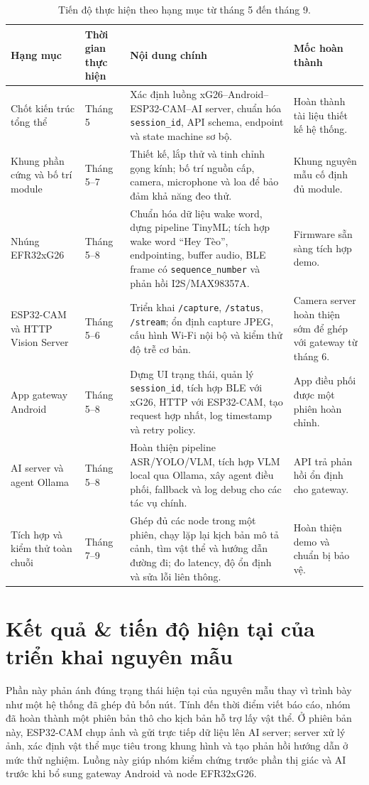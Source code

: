\documentclass[11pt,a4paper]{article}
\renewcommand{\arraystretch}{1.08}
\begin{document}
\begin{table}[H]
\centering
\caption{Tiến độ thực hiện theo hạng mục từ tháng 5 đến tháng 9.}
\small
\setlength{\tabcolsep}{4pt}
\renewcommand{\arraystretch}{1.18}
\begin{tabularx}{\textwidth}{p{3.0cm}p{2.2cm}Y p{3.0cm}}
\toprule
\textbf{Hạng mục} & \textbf{Thời gian thực hiện} & \textbf{Nội dung chính} & \textbf{Mốc hoàn thành} \\
\midrule
Chốt kiến trúc tổng thể & Tháng 5 & Xác định luồng xG26--Android--ESP32-CAM--AI server, chuẩn hóa \texttt{session\_id}, API schema, endpoint và state machine sơ bộ. & Hoàn thành tài liệu thiết kế hệ thống. \\
Khung phần cứng và bố trí module & Tháng 5--7 & Thiết kế, lắp thử và tinh chỉnh gọng kính; bố trí nguồn cấp, camera, microphone và loa để bảo đảm khả năng đeo thử. & Khung nguyên mẫu cố định đủ module. \\
Nhúng EFR32xG26 & Tháng 5--8 & Chuẩn hóa dữ liệu wake word, dựng pipeline TinyML; tích hợp wake word ``Hey Tèo'', endpointing, buffer audio, BLE frame có \texttt{sequence\_number} và phản hồi I2S/MAX98357A. & Firmware sẵn sàng tích hợp demo. \\
ESP32-CAM và HTTP Vision Server & Tháng 5--6 & Triển khai \texttt{/capture}, \texttt{/status}, \texttt{/stream}; ổn định capture JPEG, cấu hình Wi-Fi nội bộ và kiểm thử độ trễ cơ bản. & Camera server hoàn thiện sớm để ghép với gateway từ tháng 6. \\
App gateway Android & Tháng 5--8 & Dựng UI trạng thái, quản lý \texttt{session\_id}, tích hợp BLE với xG26, HTTP với ESP32-CAM, tạo request hợp nhất, log timestamp và retry policy. & App điều phối được một phiên hoàn chỉnh. \\
AI server và agent Ollama & Tháng 5--8 & Hoàn thiện pipeline ASR/YOLO/VLM, tích hợp VLM local qua Ollama, xây agent điều phối, fallback và log debug cho các tác vụ chính. & API trả phản hồi ổn định cho gateway. \\
Tích hợp và kiểm thử toàn chuỗi & Tháng 7--9 & Ghép đủ các node trong một phiên, chạy lặp lại kịch bản mô tả cảnh, tìm vật thể và hướng dẫn đường đi; đo latency, độ ổn định và sửa lỗi liên thông. & Hoàn thiện demo và chuẩn bị bảo vệ. \\
\bottomrule
\end{tabularx}
\end{table}




\section{Kết quả \& tiến độ hiện tại của triển khai nguyên mẫu}
Phần này phản ánh đúng trạng thái hiện tại của nguyên mẫu thay vì trình bày như một hệ thống đã ghép đủ bốn nút. Tính đến thời điểm viết báo cáo, nhóm đã hoàn thành một phiên bản thô cho kịch bản hỗ trợ lấy vật thể. Ở phiên bản này, ESP32-CAM chụp ảnh và gửi trực tiếp dữ liệu lên AI server; server xử lý ảnh, xác định vật thể mục tiêu trong khung hình và tạo phản hồi hướng dẫn ở mức thử nghiệm. Luồng này giúp nhóm kiểm chứng trước phần thị giác và AI trước khi bổ sung gateway Android và node EFR32xG26.
\end{document}
